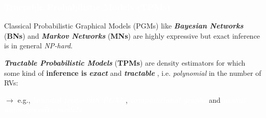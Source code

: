 \documentclass[xcolor={usenames,dvipsnames,svgnames}, compress]{beamer}
\newcommand{\highlighttext}[2][yellow]{{\colorbox{#1}{\textcolor{white}{#2}}}}
\begin{document}
\begin{frame}[t]
  \frametitle{\highlighttext[tomato2]{Tractable Probabilistic Models (TPMs)}}
  \footnotesize

    Classical Probabilistic Graphical Models (PGMs) like \emph{\textbf{Bayesian Networks}}
    (\textbf{BNs}) and \emph{\textbf{Markov Networks}} (\textbf{MNs}) are highly expressive but
    exact inference is in general \emph{NP-hard}.\par\bigskip

    \emph{\textbf{Tractable Probabilistic Models} }  (\textbf{TPMs})
     are density estimators for which some kind of  
     {\color{tractable_green}\textbf{inference is}
    \textbf{\emph{exact}}  and \textbf{\emph{tractable}}}
  , i.e. \emph{polynomial} in the number
    of RVs:
    \hspace{20pt}\begin{minipage}{1.0\columnwidth}
      \vspace{2pt}
      \scriptsize
    \raggedleft
    $\rightarrow$
    e.g., \highlighttext[petroil2]{\emph{\textbf{bounded tree-width PGMs}}}, \highlighttext[gold2]{\emph{\textbf{computational graphs}}} and \highlighttext[lacamdarklilac5]{\emph{\textbf{neural autoregressive models}}}
  \end{minipage}
  \par\bigskip\vspace{5pt}


\end{frame}
\end{document}
